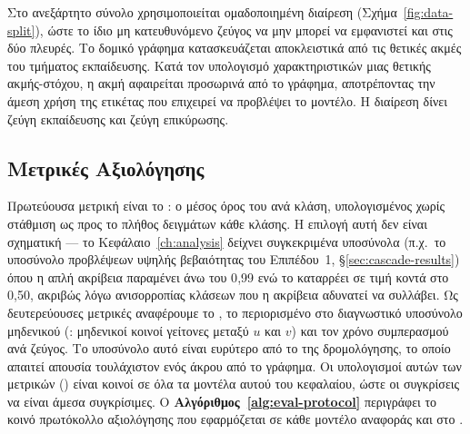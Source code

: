 Στο ανεξάρτητο σύνολο χρησιμοποιείται ομαδοποιημένη διαίρεση (Σχήμα~\ref{fig:data-split}), ώστε το ίδιο μη
κατευθυνόμενο ζεύγος να μην μπορεί να εμφανιστεί και στις δύο πλευρές.
Το δομικό
γράφημα κατασκευάζεται αποκλειστικά από τις θετικές ακμές του τμήματος
εκπαίδευσης.
Κατά τον υπολογισμό χαρακτηριστικών μιας θετικής ακμής-στόχου, η
ακμή αφαιρείται προσωρινά από το γράφημα, αποτρέποντας την άμεση χρήση της
ετικέτας που επιχειρεί να προβλέψει το μοντέλο.
Η διαίρεση δίνει
\WfTrainSplitSize{} ζεύγη εκπαίδευσης και \WfValSplitSize{} ζεύγη επικύρωσης.

\subsection{Μετρικές Αξιολόγησης}
\label{subsec:evaluation-metrics}

Πρωτεύουσα μετρική είναι το : ο μέσος όρος του  ανά
κλάση, υπολογισμένος χωρίς στάθμιση ως προς το πλήθος δειγμάτων κάθε κλάσης.
Η
επιλογή αυτή δεν είναι σχηματική --- το Κεφάλαιο~\ref{ch:analysis} δείχνει
συγκεκριμένα υποσύνολα (π.χ.\ το υποσύνολο προβλέψεων υψηλής βεβαιότητας του Επιπέδου~1,
\S\ref{sec:cascade-results}) όπου η απλή ακρίβεια παραμένει άνω του 0{,}99 ενώ το
 καταρρέει σε τιμή κοντά στο 0{,}50, ακριβώς λόγω ανισορροπίας κλάσεων
που η ακρίβεια αδυνατεί να συλλάβει.
Ως δευτερεύουσες μετρικές αναφέρουμε το
, το  περιορισμένο στο διαγνωστικό υποσύνολο μηδενικού
 (\texttt{}: μηδενικοί
κοινοί γείτονες μεταξύ $u$ και $v$) και τον χρόνο συμπερασμού ανά ζεύγος.
Το
υποσύνολο αυτό είναι ευρύτερο από το  της δρομολόγησης,
το οποίο απαιτεί απουσία τουλάχιστον ενός άκρου από το γράφημα.
Οι
υπολογισμοί αυτών των μετρικών (\texttt{}) είναι κοινοί σε
όλα τα μοντέλα αυτού του κεφαλαίου, ώστε οι συγκρίσεις να είναι άμεσα συγκρίσιμες.
Ο \textbf{Αλγόριθμος~\ref{alg:eval-protocol}} περιγράφει το κοινό πρωτόκολλο
αξιολόγησης που εφαρμόζεται σε κάθε μοντέλο αναφοράς και στο .

